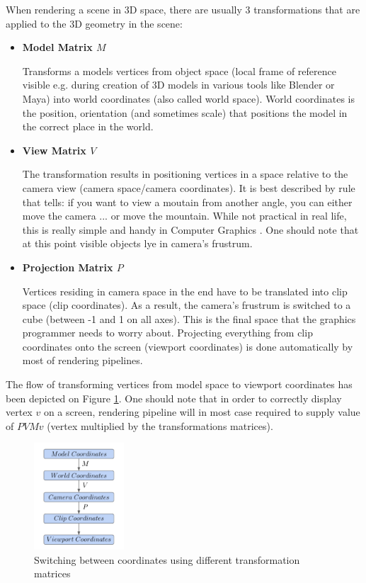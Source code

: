 \documentclass{report}
\begin{document}
When rendering a scene in 3D space, there are usually 3 transformations that are applied to the 3D geometry in the scene:
\begin{itemize}
\item \textbf{Model Matrix $M$}

Transforms a models vertices from object space (local frame of reference visible e.g. during creation of 3D models in various tools like Blender or Maya) into world coordinates (also called world space). World coordinates is the position, orientation (and sometimes scale) that positions the model in the correct place in the world.

\item \textbf{View Matrix $V$} 

The transformation results in positioning vertices in a space relative to the camera view (camera space/camera coordinates). It is best described by rule that tells: if you want to view a moutain from another angle, you can either move the camera ... or move the mountain. While not practical in real life, this is really simple and handy in Computer Graphics \cite{gl_tutorial}. One should note that at this point visible objects lye in camera's frustrum.

\item \textbf{Projection Matrix $P$}

Vertices residing in camera space in the end have to be translated into clip space (clip coordinates). As a result, the camera's frustrum is switched to a cube (between -1 and 1 on all axes). This is the final space that the graphics programmer needs to worry about. Projecting everything from clip coordinates onto the screen (viewport coordinates) is done automatically by most of rendering pipelines.

\end{itemize}
The flow of transforming vertices from model space to viewport coordinates has been depicted on Figure \ref{fig:basic_transformations}. One should note that in order to correctly display vertex $v$ on a screen, rendering pipeline will in most case required to supply value of $PVMv$ (vertex multiplied by the transformations matrices).
\begin{figure}[H]
    \centering
    \includegraphics[width=0.3\textwidth]{images/mvp_model.pdf}
    \caption{Switching between coordinates using different transformation matrices}
    \label{fig:basic_transformations}
\end{figure}
\end{document}
